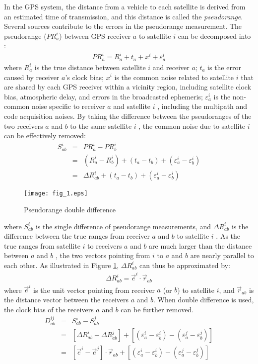 \documentclass[letterpaper, 10 pt, conference]{ieeeconf}
\begin{document}
In the GPS system, the distance from a vehicle to each satellite is derived from an estimated time of transmission, and this distance is called the \emph{pseudorange}. Several sources contribute to the errors in the pseudorange measurement. The pseudorange ($PR_a^i$) between GPS receiver $a$  to satellite $i$  can be decomposed into \cite{kaplan2006understanding}:
\begin{eqnarray}
PR_a^i  = R_a^i  + t_a  + x^i  + \varepsilon _a^i
\end{eqnarray}
where $R_a^i$ is the true distance between satellite $i$  and receiver $a$;  $t_a$ is the error caused by receiver  $a$'s clock bias;  $x^i$ is the common noise related to satellite $i$  that are shared by each GPS receiver within a vicinity region, including satellite clock bias,  atmospheric delay, and errors in the broadcasted ephemeris;  $\varepsilon_a^i$ is the non-common noise specific to receiver $a$  and satellite $i$ , including the multipath and code acquisition noises. By taking the difference between the pseudoranges of the two receivers $a$ and $b$  to the same satellite $i$ , the common noise due to satellite $i$ can be effectively removed:
\begin{eqnarray}
S^i_{ab} &=& PR^i_a - PR^i_b  \nonumber \\
        &=& (R^i_a - R^i_b) + (t_a - t_b)+ (\varepsilon^i_a - \varepsilon^i_b)   \nonumber \\
        &=& \Delta R^i_{ab} + (t_a - t_b)+ (\varepsilon^i_a - \varepsilon^i_b)
\end{eqnarray}

\begin{figure}
\centering
\texttt{[image: fig\_1.eps]}
\caption{Pseudorange double difference}
\label{fig:1}
\end{figure}
\noindent where $S^i_{ab}$ is the single difference of pseudorange measurements, and $\Delta R^i_{ab}$ is the difference between the true ranges from receiver $a$ and $b$   to satellite $i$ . As the true ranges from  satellite $i$ to receivers $a$  and $b$   are much larger than the distance between  $a$ and $b$ , the two vectors pointing from $i$  to $a$ and $b$  are nearly parallel to each other. As illustrated in Figure \ref{fig:1}, $\Delta R^i_{ab}$  can thus be approximated by:
\begin{eqnarray}
\Delta R_{ab}^i  = \vec e^i  \cdot \vec r_{ab}
\end{eqnarray}
where $\vec e^i$ is the unit vector pointing from receiver $a$ (or $b$) to satellite $i$, and $\vec r_{ab}$ is the distance vector between the receivers $a$ and $b$. When double difference is used, the clock bias of the receivers  $a$ and $b$  can be further removed.
\begin{eqnarray}
D^{ij}_{ab}    &=& S^i_{ab}-S^j_{ab}   \nonumber \\
                &=& [\Delta R^i_{ab} - \Delta R^j_{ab}]+ [(\varepsilon^i_a - \varepsilon^i_b)- (\varepsilon^j_a - \varepsilon^j_b)]   \nonumber \\
                &=& [\vec{e}^i - \vec{e}^j]\cdot \vec{r}_{ab} + [(\varepsilon^i_a - \varepsilon^i_b)- (\varepsilon^j_a - \varepsilon^j_b)]
\label{eq:dd}
\end{eqnarray}
\end{document}
